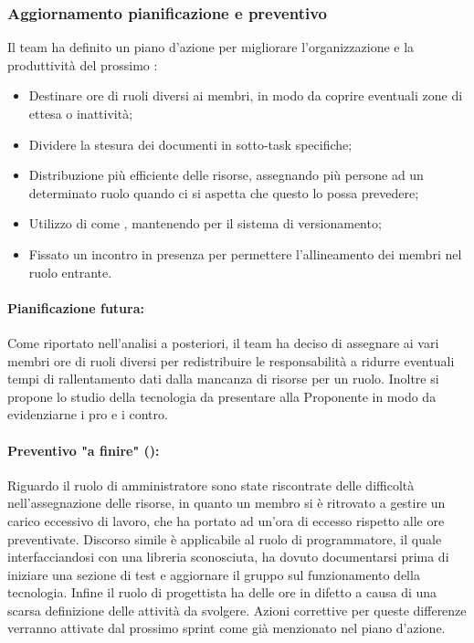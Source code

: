 \subsubsection{Aggiornamento pianificazione e preventivo}
\par Il team ha definito un piano d'azione per migliorare l'organizzazione e la produttività del prossimo :
\begin{itemize}
  \item Destinare ore di ruoli diversi ai membri, in modo da coprire eventuali zone di ettesa o inattività;
  \item Dividere la stesura dei documenti in sotto-task specifiche;
  \item Distribuzione più efficiente delle risorse, assegnando più persone ad un determinato ruolo quando ci si aspetta che questo lo possa prevedere;
  \item Utilizzo di  come , mantenendo  per il sistema di versionamento;
  \item Fissato un incontro in presenza per permettere l'allineamento dei membri nel ruolo entrante.
\end{itemize}

\paragraph*{Pianificazione futura:}
\par Come riportato nell'analisi a posteriori, il team ha deciso di assegnare ai vari membri ore di ruoli diversi per redistribuire le responsabilità a ridurre eventuali tempi di rallentamento dati dalla mancanza di risorse per un ruolo. Inoltre si propone lo studio della tecnologia  da presentare alla Proponente in modo da evidenziarne i pro e i contro.

\paragraph*{Preventivo "a finire" ():}
\par Riguardo il ruolo di amministratore sono state riscontrate delle difficoltà nell'assegnazione delle risorse, in quanto un membro si è ritrovato a gestire un carico eccessivo di lavoro, che ha portato ad un'ora di eccesso rispetto alle ore preventivate. Discorso simile è applicabile al ruolo di programmatore, il quale interfacciandosi con una libreria sconosciuta, ha dovuto documentarsi prima di iniziare una sezione di test e aggiornare il gruppo sul funzionamento della tecnologia. Infine il ruolo di progettista ha delle ore in difetto a causa di una scarsa definizione delle attività da svolgere. Azioni correttive per queste differenze verranno attivate dal prossimo sprint come già menzionato nel piano d'azione.

